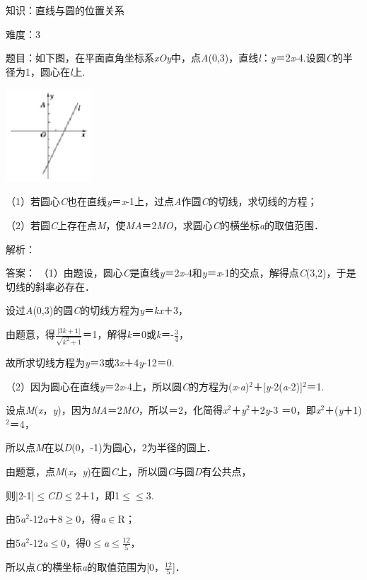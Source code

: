 \documentclass{article} %
\begin{document}
知识：直线与圆的位置关系

难度：3

题目：如下图，在平面直角坐标系\textit{xOy}中，点\textit{A}(0,3)，直线\textit{l}：\textit{y}＝2\textit{x}-4.设圆\textit{C}的半径为1，圆心在\textit{l}上.

\includegraphics*[width=1.25in, height=1.37in, keepaspectratio=false]{image314}

（1）若圆心\textit{C}也在直线\textit{y}＝\textit{x}-1上，过点\textit{A}作圆\textit{C}的切线，求切线的方程；

（2）若圆\textit{C}上存在点\textit{M}，使\textit{MA}＝2\textit{MO}，求圆心\textit{C}的横坐标\textit{a}的取值范围．

解析：

答案： （1）由题设，圆心\textit{C}是直线\textit{y}＝2\textit{x}-4和\textit{y}＝\textit{x}-1的交点，解得点\textit{C}(3,2)，于是切线的斜率必存在．

设过\textit{A}(0,3)的圆\textit{C}的切线方程为\textit{y}＝\textit{kx}＋3，

由题意，得$\frac{|3k+1|}{\sqrt{k^2+1}}$＝1，解得\textit{k}＝0或\textit{k}＝-$\frac{3}{4}$，

故所求切线方程为\textit{y}＝3或3\textit{x}＋4\textit{y}-12＝0.

（2）因为圆心在直线\textit{y}＝2\textit{x}-4上，所以圆\textit{C}的方程为(\textit{x}-\textit{a})${}^{2}$＋[\textit{y}-2(\textit{a}-2)]${}^{2}$＝1.

设点\textit{M}(\textit{x}，\textit{y})，因为\textit{MA}＝2\textit{MO}，所以＝2，化简得\textit{x}${}^{2}$＋\textit{y}${}^{2}$＋2\textit{y}-3 ＝0，即\textit{x}${}^{2}$＋(\textit{y}＋1)${}^{2}$＝4，

所以点\textit{M}在以\textit{D}(0，-1)为圆心，2为半径的圆上．

由题意，点\textit{M}(\textit{x}，\textit{y})在圆\textit{C}上，所以圆\textit{C}与圆\textit{D}有公共点，

则|2-1|$\mathrm{\le}$\textit{CD}$\mathrm{\le}$2＋1，即1$\mathrm{\le}$$\mathrm{\le}$3.

由5\textit{a}${}^{2}$-12\textit{a}＋8$\mathrm{\ge}$0，得\textit{a}$\mathrm{\in}$R；

由5\textit{a}${}^{2}$-12\textit{a}$\mathrm{\le}$0，得0$\mathrm{\le}$\textit{a}$\mathrm{\le}\frac{12}{5}$，

所以点\textit{C}的横坐标\textit{a}的取值范围为[0，$\frac{12}{5}$]．
\end{document}
